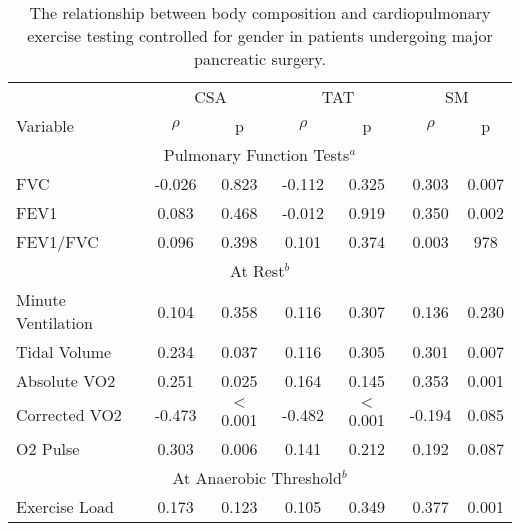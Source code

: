 \begin{table}[p]
	\caption{The relationship between body composition and cardiopulmonary exercise testing controlled for gender in patients undergoing major pancreatic surgery.}
	\label{table:bc_cpet}
	\centering
	\renewcommand{\arraystretch}{1.4} %
	\setlength{\tabcolsep}{9pt} %
	\begin{tabular}{l | c c | c c | c c}
		                   & \multicolumn{2}{c}{CSA} & \multicolumn{2}{c}{TAT} &      \multicolumn{2}{c}{SM}       \\
		Variable           & $\rho$ & p              & $\rho$ & p              & $\rho$ & p                        \\ \hline
		                             \multicolumn{7}{c}{Pulmonary Function Tests$^a$}                              \\ \hline
		FVC                & -0.026 & 0.823          & -0.112 & 0.325          & 0.303  & 0.007                    \\
		FEV1               & 0.083  & 0.468          & -0.012 & 0.919          & 0.350  & 0.002                    \\
		FEV1/FVC           & 0.096  & 0.398          & 0.101  & 0.374          & 0.003  & 978                      \\ \hline
		                                     \multicolumn{7}{c}{At Rest$^b$}                                       \\ \hline
		Minute Ventilation & 0.104  & 0.358          & 0.116  & 0.307          & 0.136  & 0.230                    \\
		Tidal Volume       & 0.234  & 0.037          & 0.116  & 0.305          & 0.301  & 0.007                    \\
		Absolute VO2       & 0.251  & 0.025          & 0.164  & 0.145          & 0.353  & 0.001                    \\
		Corrected VO2      & -0.473 & $<$0.001       & -0.482 & $<$0.001       & -0.194 & 0.085                    \\
		O2 Pulse           & 0.303  & 0.006          & 0.141  & 0.212          & 0.192  & 0.087                    \\ \hline
		                              \multicolumn{7}{c}{At Anaerobic Threshold$^b$}                               \\ \hline
		Exercise Load      & 0.173  & 0.123          & 0.105  & 0.349          & 0.377  & 0.001                    \\

\end{tabular}
\end{table}
